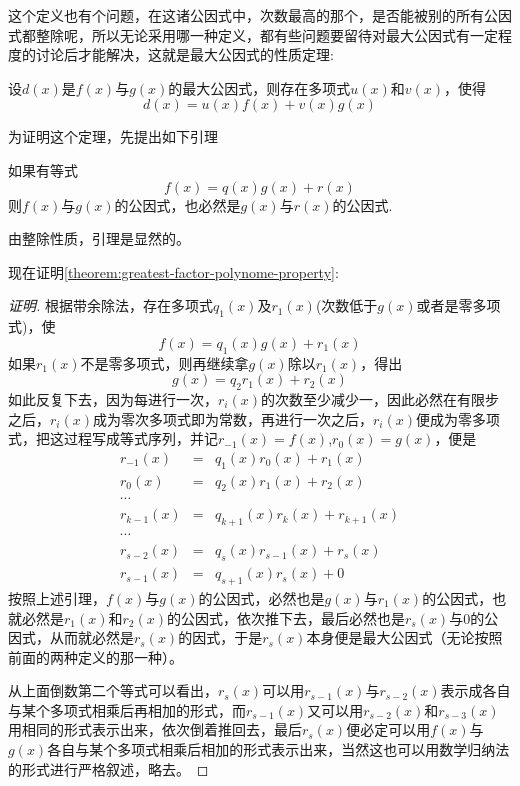 这个定义也有个问题，在这诸公因式中，次数最高的那个，是否能被别的所有公因式都整除呢，所以无论采用哪一种定义，都有些问题要留待对最大公因式有一定程度的讨论后才能解决，这就是最大公因式的性质定理:

\begin{theorem}[最大公因式性质定理]
  \label{theorem:greatest-factor-polynome-property}
  设$d(x)$是$f(x)$与$g(x)$的最大公因式，则存在多项式$u(x)$和$v(x)$，使得
  \[ d(x) = u(x)f(x) + v(x)g(x) \]
\end{theorem}

为证明这个定理，先提出如下引理
\begin{lemma}
  如果有等式
  \[ f(x)=q(x)g(x)+r(x) \]
  则$f(x)$与$g(x)$的公因式，也必然是$g(x)$与$r(x)$的公因式.
\end{lemma}
由整除性质，引理是显然的。

现在证明\autoref{theorem:greatest-factor-polynome-property}:
\begin{proof}[证明]
  根据带余除法，存在多项式$q_1(x)$及$r_1(x)$(次数低于$g(x)$或者是零多项式)，使
  \[ f(x)=q_1(x)g(x)+r_1(x) \]
  如果$r_1(x)$不是零多项式，则再继续拿$g(x)$除以$r_1(x)$，得出
  \[ g(x) = q_2r_1(x)+r_2(x) \]
  如此反复下去，因为每进行一次，$r_i(x)$的次数至少减少一，因此必然在有限步之后，$r_i(x)$成为零次多项式即为常数，再进行一次之后，$r_i(x)$便成为零多项式，把这过程写成等式序列，并记$r_{-1}(x)=f(x)$,$r_0(x)=g(x)$，便是
  \begin{eqnarray*}
    r_{-1}(x) & = & q_1(x)r_0(x)+r_1(x) \\
    r_0(x) & = & q_2(x)r_1(x)+r_2(x) \\
    \cdots \\
    r_{k-1}(x) & = & q_{k+1}(x)r_k(x)+r_{k+1}(x) \\
    \cdots \\
    r_{s-2}(x) & = & q_s(x)r_{s-1}(x) + r_s(x) \\
    r_{s-1}(x) & = & q_{s+1}(x)r_s(x) + 0
  \end{eqnarray*}
  按照上述引理，$f(x)$与$g(x)$的公因式，必然也是$g(x)$与$r_1(x)$的公因式，也就必然是$r_1(x)$和$r_2(x)$的公因式，依次推下去，最后必然也是$r_s(x)$与0的公因式，从而就必然是$r_s(x)$的因式，于是$r_s(x)$本身便是最大公因式（无论按照前面的两种定义的那一种）。

  从上面倒数第二个等式可以看出，$r_s(x)$可以用$r_{s-1}(x)$与$r_{s-2}(x)$表示成各自与某个多项式相乘后再相加的形式，而$r_{s-1}(x)$又可以用$r_{s-2}(x)$和$r_{s-3}(x)$用相同的形式表示出来，依次倒着推回去，最后$r_s(x)$便必定可以用$f(x)$与$g(x)$各自与某个多项式相乘后相加的形式表示出来，当然这也可以用数学归纳法的形式进行严格叙述，略去。
\end{proof}

